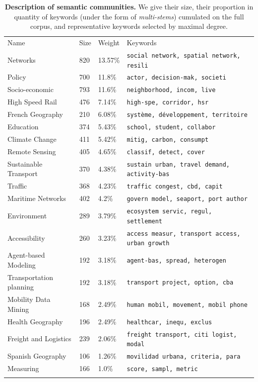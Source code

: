 \documentclass[10pt]{article}
\begin{document}
\begin{table}
\caption{\textbf{Description of semantic communities.} We give their size, their proportion in quantity of keywords (under the form of \emph{multi-stems}) cumulated on the full corpus, and representative keywords selected by maximal degree.\label{tab:semanticdomains}}
\begin{center}
\begin{tabular}{llll}
\hline\noalign{\smallskip}
Name & Size & Weight & Keywords  \\
\noalign{\smallskip}\hline\noalign{\smallskip}
Networks & 820 & 13.57\% & \texttt{social network, spatial network, resili} \\
Policy & 700 & 11.8\% & \texttt{actor, decision-mak, societi} \\
Socio-economic & 793 & 11.6\% & \texttt{neighborhood, incom, live} \\
High Speed Rail & 476 & 7.14\% & \texttt{high-spe, corridor, hsr} \\
French Geography & 210 & 6.08\% & \texttt{syst{\`e}me, d{\'e}veloppement, territoire} \\
Education & 374 & 5.43\% & \texttt{school, student, collabor} \\
Climate Change & 411 & 5.42\% & \texttt{mitig, carbon, consumpt} \\
Remote Sensing & 405 & 4.65\% & \texttt{classif, detect, cover} \\
Sustainable Transport & 370 & 4.38\% & \texttt{sustain urban, travel demand, activity-bas} \\
Traffic & 368 & 4.23\% & \texttt{traffic congest, cbd, capit} \\
Maritime Networks & 402 & 4.2\% & \texttt{govern model, seaport, port author} \\
Environment & 289 & 3.79\% & \texttt{ecosystem servic, regul, settlement} \\
Accessibility & 260 & 3.23\% & \texttt{access measur, transport access, urban growth} \\
Agent-based Modeling & 192 & 3.18\% & \texttt{agent-bas, spread, heterogen} \\
Transportation planning & 192 & 3.18\% & \texttt{transport project, option, cba} \\
Mobility Data Mining & 168 & 2.49\% & \texttt{human mobil, movement, mobil phone} \\
Health Geography & 196 & 2.49\% & \texttt{healthcar, inequ, exclus} \\
Freight and Logistics & 239 & 2.06\% & \texttt{freight transport, citi logist, modal} \\
Spanish Geography & 106 & 1.26\% & \texttt{movilidad urbana, criteria, para} \\
Measuring & 166 & 1.0\% & \texttt{score, sampl, metric} \\
\noalign{\smallskip}\hline
\end{tabular}
\end{center}
\end{table}
\end{document}
